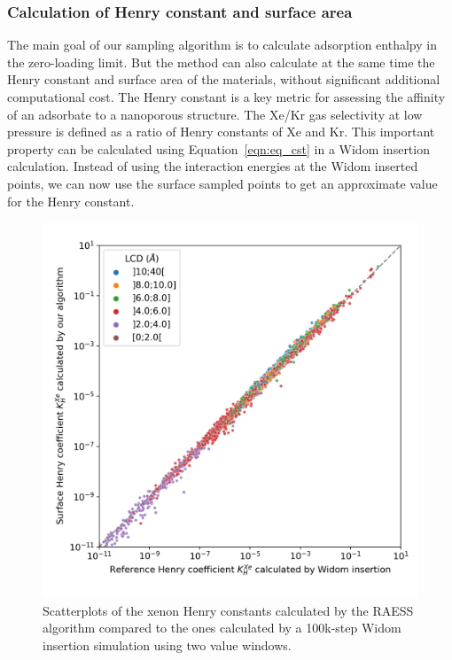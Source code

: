 \documentclass[main]{subfiles}
\begin{document}
\subsubsection{Calculation of Henry constant and surface area}

The main goal of our sampling algorithm is to calculate adsorption enthalpy in the zero-loading limit. But the method can also calculate at the same time the Henry constant and surface area of the materials, without significant additional computational cost. The Henry constant is a key metric for assessing the affinity of an adsorbate to a nanoporous structure. The Xe/Kr gas selectivity at low pressure is defined as a ratio of Henry constants of Xe and Kr. This important property can be calculated using Equation~\ref{eqn:eq_cst} in a Widom insertion calculation. Instead of using the interaction energies at the Widom inserted points, we can now use the surface sampled points to get an approximate value for the Henry constant.

\begin{figure}[ht]
  \centering
  \includegraphics[width=0.6\linewidth]{figures/3-fastsim/K_Xe_widom_vs_K_Xe_surface_final_zoom.jpg}
    \caption{Scatterplots of the xenon Henry constants calculated by the RAESS algorithm compared to the ones calculated by a 100k-step Widom insertion simulation using two value windows.}\label{fgr:henry_scatter}
\end{figure}
\end{document}
